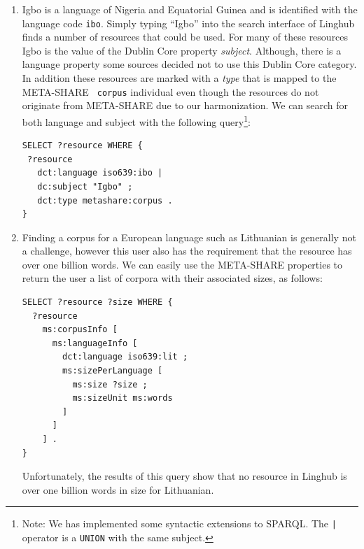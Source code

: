\documentclass{acm_proc_article-sp}
\begin{document}
\begin{enumerate}

\item {}

Igbo is a language of Nigeria and Equatorial Guinea and is identified with the
language code {\tt ibo}. Simply typing ``Igbo'' into the search interface of
Linghub finds a number of resources that could be used. For many of these
resources Igbo is the value of the Dublin Core property \emph{subject}. Although, there is a language property
some sources decided not to use this Dublin Core category. In addition these
resources are marked with a \emph{type} that is mapped to the META-SHARE {\tt
corpus} individual even though the resources do not originate from META-SHARE
due to our harmonization. We can search for
both language and subject with the following query\footnote{Note: We has
    implemented some syntactic extensions to SPARQL. The \texttt{|} operator is
a \texttt{UNION} with the same subject.}:

\begin{verbatim}
SELECT ?resource WHERE {
 ?resource
   dct:language iso639:ibo |
   dc:subject "Igbo" ;
   dct:type metashare:corpus .
}
\end{verbatim}

\item {}

Finding a corpus for a European language such as Lithuanian is generally not a
challenge, however this user also has the requirement that the resource has over
one billion words. We can easily use the META-SHARE properties to return the
user a list of corpora with their associated sizes, as follows:

\begin{verbatim}
SELECT ?resource ?size WHERE {
  ?resource
    ms:corpusInfo [
      ms:languageInfo [
        dct:language iso639:lit ;
        ms:sizePerLanguage [
          ms:size ?size ;
          ms:sizeUnit ms:words
        ]
      ]
    ] .
}
\end{verbatim}

Unfortunately, the results of this query show that no resource in Linghub is
over one billion words in size for Lithuanian.
      

\end{enumerate}
\end{document}
